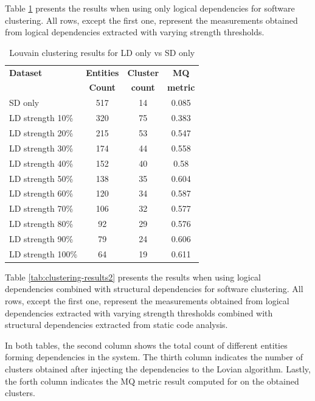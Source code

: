 \documentclass[conference]{IEEEtran}
\begin{document}
Table \ref{tab:clustering-results1} presents the results when using only logical dependencies for software clustering. All rows, except the first one, represent the measurements obtained from logical dependencies extracted with varying strength thresholds.


\begin{table}[htbp]
  \centering
  \caption{Louvain clustering results for LD only vs SD only}
  \label{tab:clustering-results1}
  \begin{tabular}{lc|c|c}
    \toprule
    \textbf{Dataset} & \textbf{Entities} & \textbf{Cluster} & \textbf{MQ } \\
    & \textbf{Count} & \textbf{count} &  \textbf{metric} \\
    \midrule
    SD only & 517 & 14 &  0.085  \\
    \midrule
LD  strength    10\%    &   320 &   75  &   0.383   \\
LD  strength    20\%    &   215 &   53  &   0.547   \\
LD  strength    30\%    &   174 &   44  &   0.558   \\
LD  strength    40\%    &   152 &   40  &   0.58    \\
LD  strength    50\%    &   138 &   35  &   0.604   \\
LD  strength    60\%    &   120 &   34  &   0.587   \\
LD  strength    70\%    &   106 &   32  &   0.577   \\
LD  strength    80\%    &   92  &   29  &   0.576   \\
LD  strength    90\%    &   79  &   24  &   0.606   \\
LD  strength    100\%   &   64  &   19  &   0.611   \\
    \bottomrule
  \end{tabular}
\end{table}


Table \ref{tab:clustering-results2} presents the results when using logical dependencies combined with structural dependencies for software clustering. All rows, except the first one, represent the measurements obtained from logical dependencies extracted with varying strength thresholds combined with structural dependencies extracted from static code analysis.

In both tables, the second column shows the total count of different entities forming dependencies in the system. The thirth column indicates the number of clusters obtained after injecting the dependencies to the Lovian algorithm. Lastly, the forth column indicates the MQ metric result computed for on the obtained clusters.
\end{document}
